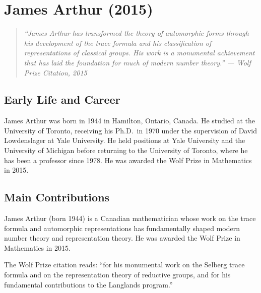 \providecommand{\Sp}{\operatorname{Sp}}
\let\HH\relax
\newcommand{\HH}{\mathbb{H}}

\chapter{James Arthur (2015)}

\begin{quote}
\it ``James Arthur has transformed the theory of automorphic forms through his development of the trace formula and his classification of representations of classical groups. His work is a monumental achievement that has laid the foundation for much of modern number theory.'' --- Wolf Prize Citation, 2015
\end{quote}

\section{Early Life and Career}

James Arthur was born in 1944 in Hamilton, Ontario, Canada. He studied at the University of Toronto, receiving his Ph.D.\ in 1970 under the supervision of David Lowdenslager at Yale University. He held positions at Yale University and the University of Michigan before returning to the University of Toronto, where he has been a professor since 1978. He was awarded the Wolf Prize in Mathematics in 2015.

\section{Main Contributions}

James Arthur (born 1944) is a Canadian mathematician whose work on the trace formula and automorphic representations has fundamentally shaped modern number theory and representation theory. He was awarded the Wolf Prize in Mathematics in 2015.

The Wolf Prize citation reads: ``for his monumental work on the Selberg trace formula and on the representation theory of reductive groups, and for his fundamental contributions to the Langlands program.''

